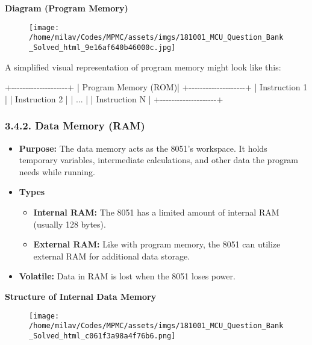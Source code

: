 \documentclass[
]{article}
\newenvironment{Shaded}{}{}
\newcommand{\NormalTok}[1]{#1}
\begin{document}
\textbf{Diagram (Program Memory)}

\begin{figure}
\centering
\texttt{[image: /home/milav/Codes/MPMC/assets/imgs/181001\_MCU\_Question\_Bank\_Solved\_html\_9e16af640b46000c.jpg]}
\caption{}
\end{figure}

A simplified visual representation of program memory might look like
this:

\begin{Shaded}
\begin{Highlighting}[]
\NormalTok{+{-}{-}{-}{-}{-}{-}{-}{-}{-}{-}{-}{-}{-}{-}{-}{-}{-}{-}{-}{-}+}
\NormalTok{| Program Memory (ROM)|}
\NormalTok{+{-}{-}{-}{-}{-}{-}{-}{-}{-}{-}{-}{-}{-}{-}{-}{-}{-}{-}{-}{-}+}
\NormalTok{|  Instruction 1      |}
\NormalTok{|  Instruction 2      |}
\NormalTok{|        ...          |}
\NormalTok{|  Instruction N      |}
\NormalTok{+{-}{-}{-}{-}{-}{-}{-}{-}{-}{-}{-}{-}{-}{-}{-}{-}{-}{-}{-}{-}+}
\end{Highlighting}
\end{Shaded}

\hypertarget{342-data-memory-ram}{%
\subsubsection{3.4.2. Data Memory (RAM)}\label{342-data-memory-ram}}

\begin{itemize}
\item
  \textbf{Purpose:} The data memory acts as the 8051's workspace. It
  holds temporary variables, intermediate calculations, and other data
  the program needs while running.
\item
  \textbf{Types}

  \begin{itemize}
  \item
    \textbf{Internal RAM:} The 8051 has a limited amount of internal RAM
    (usually 128 bytes).
  \item
    \textbf{External RAM:} Like with program memory, the 8051 can
    utilize external RAM for additional data storage.
  \end{itemize}
\item
  \textbf{Volatile:} Data in RAM is lost when the 8051 loses power.
\end{itemize}

\textbf{Structure of Internal Data Memory}

\begin{figure}
\centering
\texttt{[image: /home/milav/Codes/MPMC/assets/imgs/181001\_MCU\_Question\_Bank\_Solved\_html\_c061f3a98a4f76b6.png]}
\caption{}
\end{figure}
\end{document}
